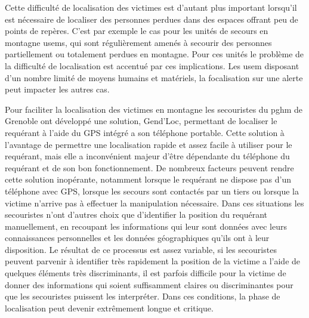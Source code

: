 
Cette difficulté de localisation des victimes est d'autant plus
important lorsqu'il est nécessaire de localiser des personnes perdues
dans des espaces offrant peu de points de repères. C'est par exemple
le cas pour les unités de secours en montagne \acp{usem}, qui sont
régulièrement amenés à secourir des personnes partiellement ou
totalement perdues en montagne. Pour ces unités le problème de la
difficulté de localisation est accentué par ces implications. Les
\ac{usem} disposant d'un nombre limité de moyens humains et matériels,
la focalisation sur une alerte peut impacter les autres cas.

Pour faciliter la localisation des victimes en montagne les
secouristes du \ac{pghm} de Grenoble ont développé une solution,
Gend'Loc, permettant de localiser le requérant à l'aide du GPS intégré
a son téléphone portable. Cette solution à l'avantage de permettre une
localisation rapide et assez facile à utiliser pour le requérant, mais
elle a inconvénient majeur d'être dépendante du téléphone du requérant
et de son bon fonctionnement. De nombreux facteurs peuvent rendre
cette solution inopérante, notamment lorsque le requérant ne dispose
pas d'un téléphone avec GPS, lorsque les secours sont contactés par un
tiers ou lorsque la victime n'arrive pas à effectuer la manipulation
nécessaire. Dans ces situations les secouristes n'ont d'autres choix
que d'identifier la position du requérant manuellement, en recoupant
les informations qui leur sont données avec leurs connaissances
personnelles et les données géographiques qu'ils ont à leur
disposition. Le résultat de ce processus est assez variable, si les
secouristes peuvent parvenir à identifier très rapidement la position
de la victime a l'aide de quelques éléments très discriminants, il est
parfois difficile pour la victime de donner des informations qui
soient suffisamment claires ou discriminantes pour que les secouristes
puissent les interpréter. Dans ces conditions, la phase de
localisation peut devenir extrêmement longue et critique.

